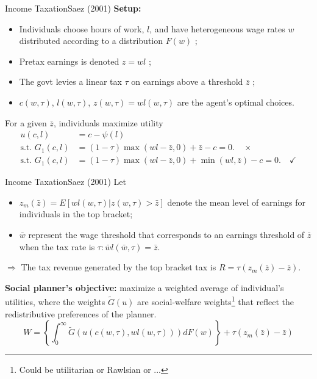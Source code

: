 \documentclass{beamer}
\begin{document}
\begin{frame}{Income Taxation}{Saez (2001)}
	\textbf{Setup:}
	\begin{itemize}
		\item Individuals choose hours of work, $l$, and have heterogeneous wage rates $w$ distributed according to a distribution $F(w)$ ;
		\item Pretax earnings is denoted $z=wl$ ;
		\item The govt levies a linear tax $\tau$ on earnings above a threshold $\bar{z}$ ;
		\item $c(w,\tau)$, $l(w,\tau)$, $z(w,\tau)=wl(w,\tau)$ are the agent's optimal choices.
	\end{itemize}
	\medskip

	For a given $\bar{z}$, individuals maximize utility
	\begin{equation}
		\begin{aligned}
			u(c,l) &= c - \psi(l) \\
			\mbox{s.t. }G_1(c,l) &= (1-\tau)\max (wl-\bar{z},0) + \bar{z} - c = 0. \quad \times \\
			\mbox{s.t. }G_1(c,l) &= (1-\tau)\max (wl-\bar{z},0) + \min(wl,\bar{z}) - c = 0. \quad \checkmark
		\end{aligned}
	\end{equation}
\end{frame}
\begin{frame}{Income Taxation}{Saez (2001)}
	Let
	\begin{itemize}
		\item $z_m(\bar{z})=E[wl(w,\tau)|z(w,\tau)>\bar{z}]$ denote the mean level of earnings for individuals in the top bracket;
		\item $\bar{w}$ represent the wage threshold that corresponds to an earnings threshold of $\bar{z}$ when the tax rate is $\tau:\bar{w}l(\bar{w},\tau)=\bar{z}$.
	\end{itemize}
	$\Rightarrow$ The tax revenue generated by the top bracket tax is $R=\tau(z_m(\bar{z})-\bar{z})$.
	\medskip

	\textbf{Social planner’s objective:} maximize a weighted average of individual’s utilities, where the weights $\tilde{G}(u)$ are social-welfare weights\footnote{Could be utilitarian or Rawlsian or ...} that reflect the redistributive preferences of the planner.
	\begin{equation}
		W=\left\{\int_0^\infty \tilde{G}(u(c(w,\tau),wl(w,\tau)))dF(w)\right\} + \tau(z_m(\bar{z})-\bar{z})
	\end{equation}
\end{frame}
\end{document}
